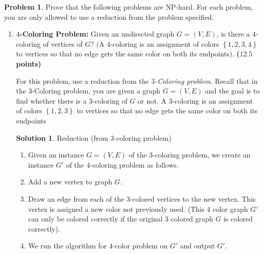\documentclass{article}
\theoremstyle{definition}
\newtheorem{problem}{Problem}
\newtheorem*{solution*}{Solution}
\newenvironment{solution}{\begin{solution*}}{{} \end{solution*}}
\newcommand{\grade}[1]{\hfill{\textbf{($\mathbf{#1}$ points)}}}
\newcommand{\set}[1]{\ensuremath{\left\{ #1 \right\}}}
\begin{document}
\newpage

\begin{problem}\label{NP}
	Prove that the following problems are NP-hard. For each problem, you are only allowed to use a reduction from the problem specified. 
	
	\begin{enumerate}[label=(\alph*)]
	
		\item \textbf{$4$-Coloring Problem:} Given an undirected graph $G=(V,E)$, is there a $4$-coloring of vertices of $G$? (A $4$-coloring is an assignment of colors $\set{1,2,3,4}$ to vertices so that no edge gets the same color on both its endpoints). 
		\grade{12.5}
		
		\medskip
		For this problem, use a reduction from the \emph{$3$-Coloring problem}. Recall that in the $3$-Coloring problem, you are given a graph $G=(V,E)$ and the goal is to find whether there is a $3$-coloring of $G$ or not. A $3$-coloring is an assignment of colors $\set{1,2,3}$ to vertices so that no edge gets the same color on both its endpoints
			
				\medskip
		\begin{solution} 
		Reduction (from 3-coloring problem)
		\begin{enumerate}
		\item Given an instance $G = (V, E)$ of the 3-coloring problem, we create an instance $G'$ of the 4-coloring problem as follows.
		\item Add a new vertex to graph $G$. 
		\item Draw an edge from each of the 3-colored vertices to the new vertex. This vertex is assigned a new color not previously used. (This 4 color graph $G'$ can only be colored correctly if the original 3 colored graph $G$ is colored correctly).
		\item We run the algorithm for 4-color problem on $G'$ and output $G'$. 
		\end{enumerate}
		

\end{solution}
\end{enumerate}
\end{problem}
\end{document}

